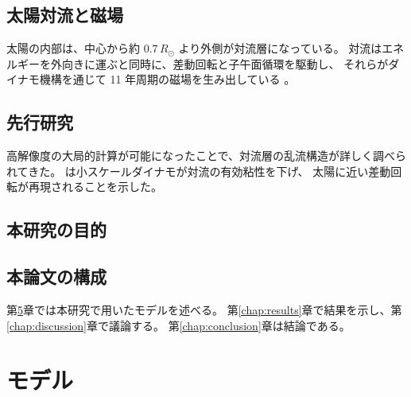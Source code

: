 \documentclass[a4paper,11pt,twoside,openright]{ltjsbook}
\begin{document}
\section{太陽対流と磁場}
\label{sec:intro_convection}

太陽の内部は、中心から約 $0.7\,R_\odot$ より外側が対流層になっている。
対流はエネルギーを外向きに運ぶと同時に、差動回転と子午面循環を駆動し、
それらがダイナモ機構を通じて 11 年周期の磁場を生み出している
\citep{charbonneau2020}。

\section{先行研究}
\label{sec:intro_previous}

高解像度の大局的計算が可能になったことで、対流層の乱流構造が詳しく調べられてきた。
\citet{hotta2021} は小スケールダイナモが対流の有効粘性を下げ、
太陽に近い差動回転が再現されることを示した。

\section{本研究の目的}
\label{sec:intro_purpose}


\section{本論文の構成}
\label{sec:intro_outline}

第\ref{chap:method}章では本研究で用いたモデルを述べる。
第\ref{chap:results}章で結果を示し、第\ref{chap:discussion}章で議論する。
第\ref{chap:conclusion}章は結論である。


\chapter{モデル}
\label{chap:method}

\end{document}

